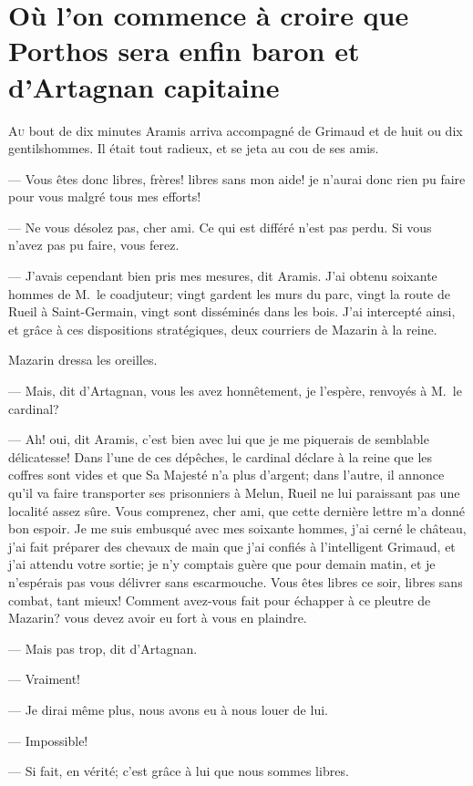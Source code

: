 \chapter[Porthos sera enfin baron et d'Artagnan capitaine]{Où l'on commence à croire que Porthos sera enfin baron et d'Artagnan capitaine}

\lettrine{A}{u} bout de dix minutes Aramis arriva accompagné de Grimaud et de huit ou dix gentilshommes. Il était tout radieux, et se jeta au cou de ses amis.

\zz
— Vous êtes donc libres, frères! libres sans mon aide! je n'aurai donc rien pu faire pour vous malgré tous mes efforts!

— Ne vous désolez pas, cher ami. Ce qui est différé n'est pas perdu. Si vous n'avez pas pu faire, vous ferez.

— J'avais cependant bien pris mes mesures, dit Aramis. J'ai obtenu soixante hommes de M.~le coadjuteur; vingt gardent les murs du parc, vingt la route de Rueil à Saint-Germain, vingt sont disséminés dans les bois. J'ai intercepté ainsi, et grâce à ces dispositions stratégiques, deux courriers de Mazarin à la reine.

Mazarin dressa les oreilles.

— Mais, dit d'Artagnan, vous les avez honnêtement, je l'espère, renvoyés à M.~le cardinal?

— Ah! oui, dit Aramis, c'est bien avec lui que je me piquerais de semblable délicatesse! Dans l'une de ces dépêches, le cardinal déclare à la reine que les coffres sont vides et que Sa Majesté n'a plus d'argent; dans l'autre, il annonce qu'il va faire transporter ses prisonniers à Melun, Rueil ne lui paraissant pas une localité assez sûre. Vous comprenez, cher ami, que cette dernière lettre m'a donné bon espoir. Je me suis embusqué avec mes soixante hommes, j'ai cerné le château, j'ai fait préparer des chevaux de main que j'ai confiés à l'intelligent Grimaud, et j'ai attendu votre sortie; je n'y comptais guère que pour demain matin, et je n'espérais pas vous délivrer sans escarmouche. Vous êtes libres ce soir, libres sans combat, tant mieux! Comment avez-vous fait pour échapper à ce pleutre de Mazarin? vous devez avoir eu fort à vous en plaindre.

— Mais pas trop, dit d'Artagnan.

— Vraiment!

— Je dirai même plus, nous avons eu à nous louer de lui.

— Impossible!

— Si fait, en vérité; c'est grâce à lui que nous sommes libres.

